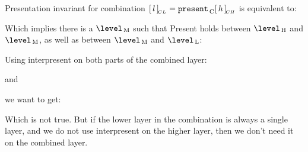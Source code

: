 
Presentation invariant for combination $[\,{l}\,]_{\!_{CL}} = {\tt present}_{\, \mathrm C} [\,{h}\,]_{\!_{CH}}$ is equivalent to:


Which implies there is a $\level\M$ such that {\sc Present} holds between $\level\H$ and $\level\M$, as well as between $\level\M$ and $\level\L$:







Using interpresent on both parts of the combined layer:


and



we want to get:


Which is not true. But if the lower layer in the combination is always a single layer, and we do not use interpresent on the higher layer, then we don't need it on the combined layer.
%



